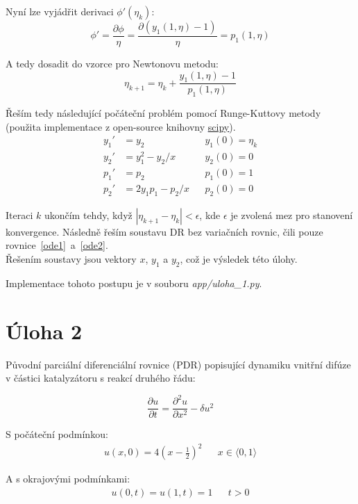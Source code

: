 \documentclass[a4paper,12pt]{article}
\begin{document}
Nyní lze vyjádřit derivaci $\phi'(\eta_k)$:
\begin{equation}
	\phi' = \frac{\partial \phi}{\eta} = \frac{\partial (y_1(1, \eta) - 1)}{\eta} = p_1(1, \eta)
\end{equation}

A tedy dosadit do vzorce pro Newtonovu metodu:
\begin{equation}
	\eta_{k+1} = \eta_{k} + \frac{y_1(1, \eta) - 1}{p_1(1, \eta)}
\end{equation}

Řeším tedy následující počáteční problém pomocí Runge-Kuttovy metody (použita implementace z open-source knihovny \textcolor{blue}{\underline{\href{https://scipy.org/}{scipy}}}).
\begin{align}
\label{ode1}
	y_1' &= y_2 &&
	y_1(0) = \eta_k
	\\
\label{ode2}
	y_2' &= y_1^2 - y_2 / x &&
	y_2(0) = 0
	\\
	p_1' &= p_2 &&
	p_1(0) = 1
	\\
	p_2' &= 2 y_1 p_1 - p_2 / x &&
	p_2(0) = 0
\end{align}

Iteraci $k$ ukončím tehdy, když $|\eta_{k+1} - \eta_{k}| < \epsilon$, kde $\epsilon$ je zvolená mez pro stanovení konvergence.
Následně řeším soustavu DR bez variačních rovnic, čili pouze rovnice~\ref{ode1}~a~\ref{ode2}. \\
Řešením soustavy jsou vektory $x$, $y_1$ a $y_2$, což je výsledek této úlohy.

Implementace tohoto postupu je v souboru \textit{app/uloha\_1.py}.



\newpage
\section*{Úloha 2}
Původní parciální diferenciální rovnice (PDR) popisující dynamiku vnitřní difúze v částici katalyzátoru s reakcí druhého řádu:

\begin{equation}
	\frac{\partial u}{\partial t} = \frac{\partial^2 u}{\partial x^2} - \delta u^2
\end{equation}

S počáteční podmínkou:
\begin{align}
	u(x,0) = 4 (x - \tfrac{1}{2})^2 && x \in \langle0, 1\rangle
\end{align}

A s okrajovými podmínkami:
\begin{align}
	u(0,t) = u(1,t) = 1 && t > 0
\end{align}
\end{document}
